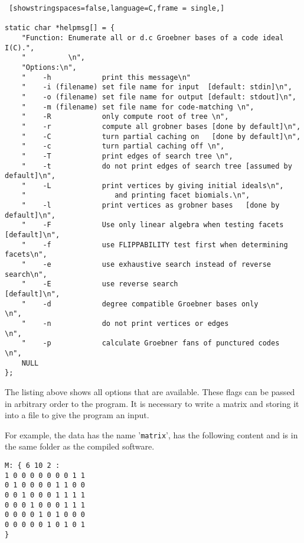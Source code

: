 \begin{lstlisting} [showstringspaces=false,language=C,frame = single,]

static char *helpmsg[] = {
    "Function: Enumerate all or d.c Groebner bases of a code ideal I(C).",
    "          \n",
    "Options:\n",
    "    -h            print this message\n"
    "    -i (filename) set file name for input  [default: stdin]\n",
    "    -o (filename) set file name for output [default: stdout]\n",
    "    -m (filename) set file name for code-matching \n",
    "    -R            only compute root of tree \n",
    "    -r            compute all grobner bases [done by default]\n",
    "    -C            turn partial caching on   [done by default]\n",
    "    -c            turn partial caching off \n",
    "    -T            print edges of search tree \n",
    "    -t            do not print edges of search tree [assumed by default]\n",  
    "    -L            print vertices by giving initial ideals\n",
    "                     and printing facet biomials.\n",
    "    -l            print vertices as grobner bases   [done by default]\n",
    "    -F            Use only linear algebra when testing facets [default]\n",
    "    -f            use FLIPPABILITY test first when determining facets\n",
    "    -e            use exhaustive search instead of reverse search\n",
    "    -E            use reverse search                   [default]\n",
    "    -d            degree compatible Groebner bases only         \n",
    "    -n            do not print vertices or edges                \n",
    "    -p            calculate Groebner fans of punctured codes    \n",
    NULL
};

\end{lstlisting}

The listing above shows all options that are available. These flags can be passed in arbitrary order to the program. It is necessary to write a matrix and storing it into a file to give the program an input.

For example, the data has the name '\texttt{matrix}', has the following content and is in the same folder as the compiled software.
\begin{lstlisting}[basicstyle=\fontfamily{courier}\selectfont]
M: { 6 10 2 :
1 0 0 0 0 0 0 0 1 1 
0 1 0 0 0 0 1 1 0 0 
0 0 1 0 0 0 1 1 1 1 
0 0 0 1 0 0 0 1 1 1 
0 0 0 0 1 0 1 0 0 0 
0 0 0 0 0 1 0 1 0 1 
}
\end{lstlisting}

